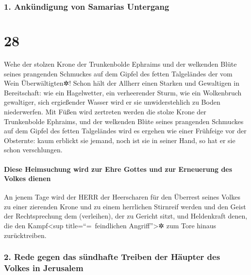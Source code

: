 \hypertarget{ankuxfcndigung-von-samarias-untergang}{%
\subsubsection{1. Ankündigung von Samarias
Untergang}\label{ankuxfcndigung-von-samarias-untergang}}

\hypertarget{section-27}{%
\section{28}\label{section-27}}

Wehe der stolzen Krone der Trunkenbolde Ephraims und der
welkenden Blüte seines prangenden Schmuckes auf dem Gipfel des fetten
Talgeländes der vom Wein Überwältigten✲! Schon hält der
Allherr einen Starken und Gewaltigen in Bereitschaft: wie ein
Hagelwetter, ein verheerender Sturm, wie ein Wolkenbruch gewaltiger,
sich ergießender Wasser wird er sie unwiderstehlich zu Boden
niederwerfen. Mit Füßen wird zertreten werden die stolze
Krone der Trunkenbolde Ephraims, und der welkenden Blüte
seines prangenden Schmuckes auf dem Gipfel des fetten Talgeländes wird
es ergehen wie einer Frühfeige vor der Obsternte: kaum erblickt sie
jemand, noch ist sie in seiner Hand, so hat er sie schon verschlungen.

\hypertarget{diese-heimsuchung-wird-zur-ehre-gottes-und-zur-erneuerung-des-volkes-dienen}{%
\paragraph{Diese Heimsuchung wird zur Ehre Gottes und zur Erneuerung des
Volkes
dienen}\label{diese-heimsuchung-wird-zur-ehre-gottes-und-zur-erneuerung-des-volkes-dienen}}

An jenem Tage wird der HERR der Heerscharen für den
Überrest seines Volkes zu einer zierenden Krone und zu einem herrlichen
Stirnreif werden und den Geist der Rechtsprechung dem
(verleihen), der zu Gericht sitzt, und Heldenkraft denen, die den
Kampf\textless sup title=``=~feindlichen Angriff''\textgreater✲ zum Tore
hinaus zurücktreiben.

\hypertarget{rede-gegen-das-suxfcndhafte-treiben-der-huxe4upter-des-volkes-in-jerusalem}{%
\subsubsection{2. Rede gegen das sündhafte Treiben der Häupter des
Volkes in
Jerusalem}\label{rede-gegen-das-suxfcndhafte-treiben-der-huxe4upter-des-volkes-in-jerusalem}}

